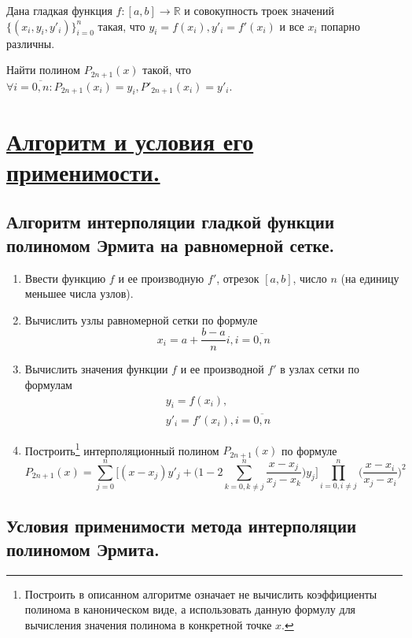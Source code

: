 \documentclass[a4paper, 12pt]{article}
\begin{document}
	Дана гладкая функция $f:[a,b]\rightarrow \mathbb{R}$ и совокупность троек значений $\{(x_i,y_i,y'_i)\}_{i=0}^n$ такая, что $y_i=f(x_i), y'_i=f'(x_i)$ и все $x_i$ попарно различны. 
	
	Найти полином $P_{2n+1}(x)$ такой, что $\forall i=\overline{0,n} : P_{2n+1}(x_i)=y_i, P'_{2n+1}(x_i) =y'_i$.
	
	\section{\underline{Алгоритм и условия его применимости.}}
	
	\subsection{Алгоритм интерполяции гладкой функции полиномом Эрмита на равномерной сетке.}
	
	\begin{enumerate}
		\item Ввести функцию $f$ и ее производную $f'$, отрезок $[a,b]$, число $n$ (на единицу меньшее числа узлов).
		\item Вычислить узлы равномерной сетки по формуле
		\begin{equation}
			x_i=a+\frac{b-a}{n}i, i=\overline{0,n}
		\end{equation}
		\item Вычислить значения функции $f$ и ее производной $f'$ в узлах сетки по формулам
		\begin{equation}
			\begin{aligned}
			&y_i=f(x_i),\\
			&y'_i=f'(x_i), i=\overline{0,n}
			\end{aligned}
		\end{equation}
		\item Построить\footnote{Построить в описанном алгоритме означает не вычислить коэффициенты полинома в каноническом виде, а использовать данную формулу для вычисления значения полинома в конкретной точке $x$.} интерполяционный полином $P_{2n+1}(x)$ по формуле
		\begin{equation}
			P_{2n+1}(x)=\sum\limits_{j=0}^n\bigg[(x-x_j)y'_j+\bigg(1-2\sum\limits_{k=0,k\neq j}^n\frac{x-x_j}{x_j-x_k}\bigg)y_j\bigg]\prod\limits_{i=0,i\neq j}^n\bigg(\frac{x-x_i}{x_j-x_i}\bigg)^2
		\end{equation}	
		
	\end{enumerate}

	\subsection{Условия применимости метода интерполяции полиномом Эрмита.}
	
\end{document}
